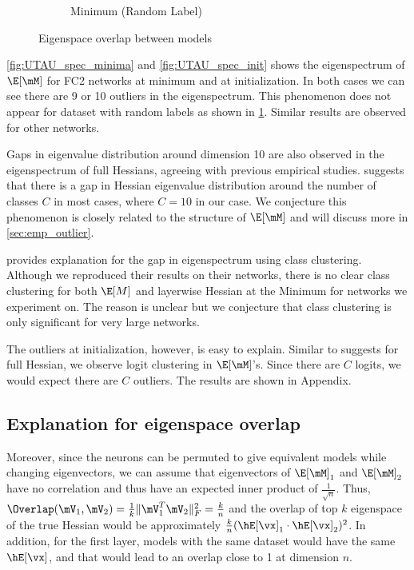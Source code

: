\begin{figure}[th]
\begin{subfigure}[b]{0.32\textwidth}
        \caption{Minimum (Random Label)}
        \label{fig:UTAU_spec_RL}
    \end{subfigure}
    \captionsetup{justification=centering}
    \caption{Eigenspace overlap between models}
    \label{fig:UTAU_spec}
\end{figure}

\cref{fig:UTAU_spec_minima} and \cref{fig:UTAU_spec_init} shows the eigenspectrum of $\E[\mM]$ for FC2 networks at minimum and at initialization. In both cases we can see there are 9 or 10 outliers in the eigenspectrum. This phenomenon does not appear for dataset with random labels as shown in \cref{fig:UTAU_spec_RL}. Similar results are observed for other networks.

Gaps in eigenvalue distribution around dimension 10 are also observed in the eigenspectrum of full Hessians, agreeing with previous empirical studies. \citet{sagun2017empirical} suggests that there is a gap in Hessian eigenvalue distribution around the number of classes $C$ in most cases, where $C=10$ in our case. We conjecture this phenomenon is closely related to the structure of $\E[\mM]$ and will discuss more in \cref{sec:emp_outlier}.

\citet{papyan2019measurements} provides explanation for the gap in eigenspectrum using class clustering. Although we reproduced their results on their networks, there is no clear class clustering for both $\E[M]$ and layerwise Hessian at the Minimum for networks we experiment on. The reason is unclear but we conjecture that class clustering is only significant for very large networks.

The outliers at initialization, however, is easy to explain. Similar to \citet{papyan2019measurements} suggests for full Hessian, we observe logit clustering in $\E[\mM]$'s. Since there are $C$ logits, we would expect there are $C$ outliers. The results are shown in Appendix.

\subsection{Explanation for eigenspace overlap}
Moreover, since the neurons can be permuted to give equivalent models while changing eigenvectors, we can assume that eigenvectors of $\E[\mM]_1$ and $\E[\mM]_2$ have no correlation and thus have an expected inner product of $\frac{1}{\sqrt{n}}$. Thus, $\Overlap(\mV_1, \mV_2) =\frac{1}{k}\|\mV_1^T\mV_2\|^2_F = \frac{k}{n}$ and the overlap of top $k$ eigenspace of the true Hessian would be approximately $\frac{k}{n}(\hE[\vx]_1 \cdot \hE[\vx]_2)^2$.  In addition, for the first layer, models with the same dataset would have the same $\hE[\vx]$, and that would lead to an overlap close to 1 at dimension $n$.

